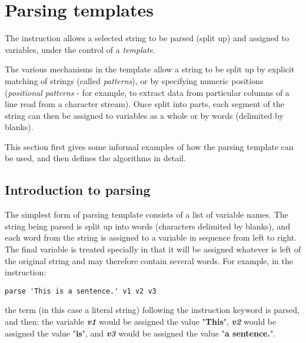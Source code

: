 \section{Parsing templates}\label{refparsing}
 The  instruction allows a selected string to
be parsed (split up) and assigned to variables, under the control of a
\emph{template}.
 
The various mechanisms in the template allow a string to be split up by
explicit matching of strings (called \emph{patterns}), or by
specifying numeric positions (\emph{positional patterns} - for
example, to extract data from particular columns of a line read from a
character stream).
Once split into parts, each segment of the string can then be assigned
to variables as a whole or by words (delimited by blanks).
 
This section first gives some informal examples of how the parsing
template can be used, and then defines the algorithms in detail.
\subsection{Introduction to parsing}\label{parseintro}
 The simplest form of parsing template consists of a list of variable
names.
The string being parsed is split up into words (characters delimited by
blanks), and each word from the string is assigned to a
variable in sequence from left to right.
The final variable is treated specially in that it will be assigned
whatever is left of the original string and may therefore contain
several words.
For example, in the  instruction:
\begin{lstlisting}
parse 'This is a sentence.' v1 v2 v3
\end{lstlisting}
the term (in this case a literal string) following the instruction
keyword is parsed, and then:  the variable \textbf{\emph{v1}}
would be assigned the value "\textbf{This}", \textbf{\emph{v2}}
would be assigned the value "\textbf{is}",
and \textbf{\emph{v3}} would be assigned the
value "\textbf{a sentence.}".
 
